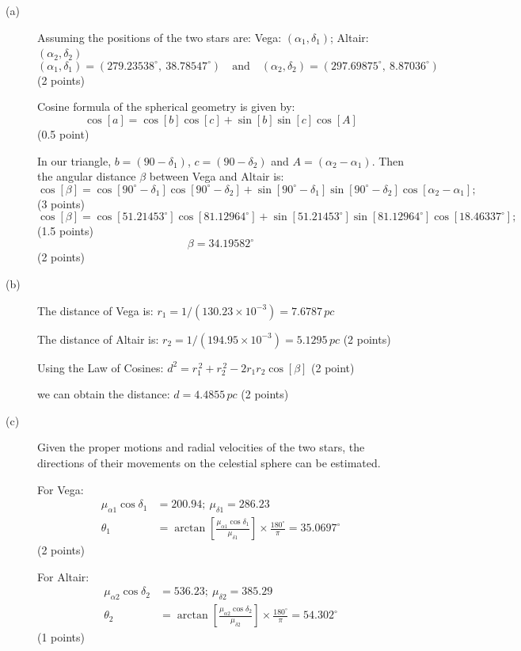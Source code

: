 \begin{description}
\item[(a)] Assuming the positions of the two stars are: Vega:
  $(\alpha_1, \delta_1)$; Altair: $(\alpha_2, \delta_2)$
  \[ (\alpha_1, \delta_1) = (279.23538^\circ,\ 38.78547^\circ)
     \quad\text{and}\quad
     (\alpha_2, \delta_2) = (297.69875^\circ,\ 8.87036^\circ) \]
  \hfill(2 points)

  Cosine formula of the spherical geometry is given by:
  \[ \cos[a] = \cos[b]\cos[c] + \sin[b]\sin[c]\cos[A] \]
  \hfill(0.5 point)

  In our triangle, $b = (90 - \delta_1)$, $c = (90 - \delta_2)$ and
  $A = (\alpha_2 - \alpha_1)$. Then the angular distance $\beta$ between
  Vega and Altair is:
  \[ \cos[\beta] = \cos[90^\circ - \delta_1]\cos[90^\circ - \delta_2]
     + \sin[90^\circ - \delta_1]\sin[90^\circ - \delta_2]
       \cos[\alpha_2 - \alpha_1]; \]
  \hfill(3 points)
  \[ \cos[\beta] = \cos[51.21453^\circ]\cos[81.12964^\circ]
     + \sin[51.21453^\circ]\sin[81.12964^\circ]\cos[18.46337^\circ]; \]
  \hfill(1.5 points)
  \[ \beta = 34.19582^\circ \]
  \hfill(2 points)

\item[(b)] The distance of Vega is:
  $r_1 = 1/(130.23\times 10^{-3}) = 7.6787\,pc$

  The distance of Altair is:
  $r_2 = 1/(194.95\times 10^{-3}) = 5.1295\,pc$ \hfill(2 points)

  Using the Law of Cosines:
  $d^2 = r_1^{\,2} + r_2^{\,2} - 2r_1 r_2\cos[\beta]$ \hfill(2 point)

  we can obtain the distance: $d = 4.4855\,pc$ \hfill(2 points)

\item[(c)] Given the proper motions and radial velocities of the two stars,
  the directions of their movements on the celestial sphere can be
  estimated.

  For Vega:
  \begin{align*}
  \mu_{\alpha 1}\cos\delta_1 &= 200.94;\ \mu_{\delta 1} = 286.23\\
  \theta_1 &= \arctan\left[\frac{\mu_{\alpha 1}\cos\delta_1}
    {\mu_{\delta 1}}\right]\times\frac{180^\circ}{\pi} = 35.0697^\circ
  \end{align*}
  \hfill(2 points)

  For Altair:
  \begin{align*}
  \mu_{\alpha 2}\cos\delta_2 &= 536.23;\ \mu_{\delta 2} = 385.29\\
  \theta_2 &= \arctan\left[\frac{\mu_{\alpha 2}\cos\delta_2}
    {\mu_{\delta 2}}\right]\times\frac{180^\circ}{\pi} = 54.302^\circ
  \end{align*}
  \hfill(1 points)


\end{description}
